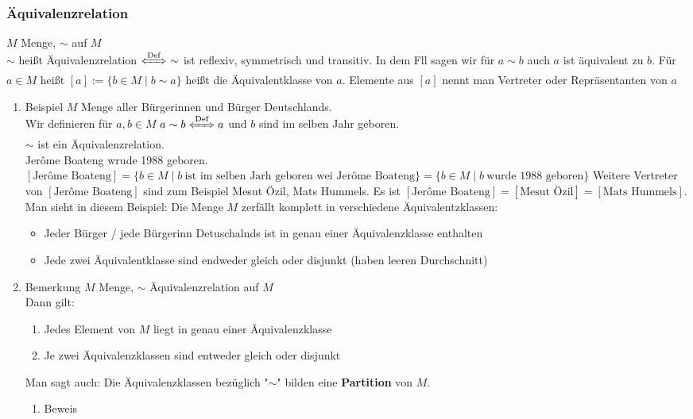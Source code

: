 \documentclass[11pt]{article}
\begin{document}
\subsubsection{Äquivalenzrelation}
\label{sec-2-5-6}
$M$ Menge, $\sim$ auf $M$ \\
    $\sim$ heißt Äquivalenzrelation $\xLeftrightarrow{\text{Def}}~\sim$ ist reflexiv, symmetrisch und transitiv.
In dem Fll sagen wir für $a\sim b$ auch $a$ ist äquivalent zu $b$. Für $a\in M$ heißt $[a]:=\{b\in M \mid b\sim a\}$ heißt die Äquivalentklasse von $a$.
Elemente aus $[a]$ nennt man Vertreter oder Repräsentanten von $a$
\begin{enumerate}
\item Beispiel
\label{sec-2-5-6-1}
$M$ Menge aller Bürgerinnen und Bürger Deutschlands. \\
     Wir definieren für $a,b\in M$ $a\sim b \xLeftrightarrow{\text{Def}} a$ und $b$ sind im selben Jahr geboren. \\
     $\sim$ ist ein Äquivalenzrelation. \\
     Jerôme Boateng wrude 1988 geboren. $[\text{Jerôme Boateng}] = \{b\in M\mid b~\text{ist im selben Jarh geboren wei Jerôme Boateng}\} = \{b\in M\mid b~\text{wurde 1988 geboren}\}$
Weitere Vertreter von $[\text{Jerôme Boateng}]$ sind zum Beispiel Mesut Özil, Mats Hummels.
Es ist $[\text{Jerôme Boateng}] = [\text{Mesut Özil}] = [\text{Mats Hummels}]$.
Man sieht in diesem Beispiel: Die Menge $M$ zerfällt komplett in verschiedene Äquivalentzklassen:
\begin{itemize}
\item Jeder Bürger / jede Bürgerinn Detuschalnds ist in genau einer Äquivalenzklasse enthalten
\item Jede zwei Äquivalentklasse sind endweder gleich oder disjunkt (haben leeren Durchschnitt)
\end{itemize}
\item Bemerkung
\label{sec-2-5-6-2}
$M$ Menge, $\sim$ Äquivalenzrelation auf $M$ \\
     Dann gilt:
\begin{enumerate}
\item Jedes Element von $M$ liegt in genau einer Äquivalenzklasse
\item Je zwei Äquivalenzklassen sind entweder gleich oder disjunkt
\end{enumerate}
Man sagt auch: Die Äquivalenzklassen bezüglich "$\sim$" bilden eine \textbf{Partition} von $M$.
\begin{enumerate}
\item Beweis

\end{enumerate}
\end{enumerate}
\end{document}
